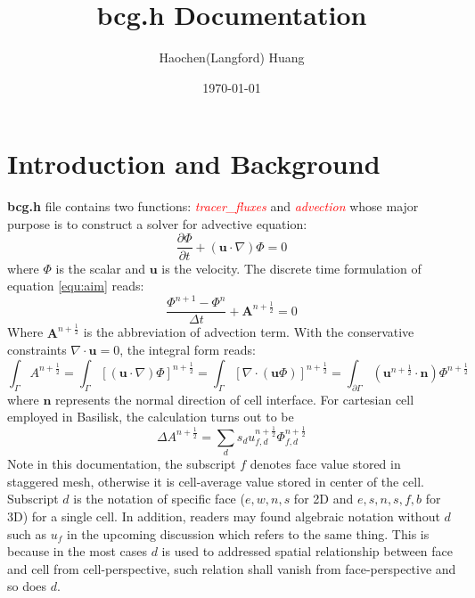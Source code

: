 \documentclass[a4paper]{article}
\title{bcg.h Documentation}
\author{Haochen(Langford) Huang}
\date{\today}
\begin{document}
\maketitle

\section{Introduction and Background}\label{sec:intro}
\textbf{bcg.h} file contains two functions: \textcolor{red}{\emph{tracer\_fluxes}} and \textcolor{red}{\emph{advection}} whose major purpose is to construct a solver for advective equation:
\begin{equation}
  \frac{\partial \Phi}{\partial t} + ( \mathbf{u} \cdot \nabla)\Phi = 0\label{equ:aim}
\end{equation}
where $\Phi$ is the scalar and $ \mathbf{u}$ is the velocity. The discrete time formulation of equation \ref{equ:aim} reads:
\begin{equation}
  \frac{\Phi^{n+1}-\Phi^{n}}{\Delta t} + \mathbf{A}^{n+\frac{1}{2}} = 0 \label{equ:general}
\end{equation}
Where $ \mathbf{A}^{n+ \frac{1}{2}}$ is the abbreviation of advection term. With the conservative constraints $\nabla \cdot \mathbf{u} = 0$, the integral form reads:
\begin{equation}
  \int_{\Gamma} A^{n+ \frac{1}{2}} = \int_{\Gamma} [( \mathbf{u}\cdot \nabla)\Phi]^{n+ \frac{1}{2}} = \int_{\Gamma} [\nabla\cdot( \mathbf{u} \Phi)]^{n+ \frac{1}{2}} = \int_{\partial \Gamma} ( \mathbf{u}^{n + \frac{1}{2}} \cdot \mathbf{n}) \Phi^{n+ \frac{1}{2}}
\end{equation}
where $ \mathbf{n}$ represents the normal direction of cell interface. For cartesian cell employed in Basilisk, the calculation turns out to be
\begin{equation}
  \Delta A^{n+ \frac{1}{2}} = \sum_{d} s_d u_{f,d}^{n+ \frac{1}{2}}\Phi_{f,d}^{n + \frac{1}{2}} 
\end{equation}
Note in this documentation, the subscript $f$ denotes face value stored in staggered mesh\cite{1965_Harlow}, otherwise it is cell-average value stored in center of the cell. Subscript $d$ is the notation of specific face ($e,w,n,s$ for 2D and $e,s,n,s,f,b$ for 3D) for a single cell. In addition, readers may found algebraic notation without $d$ such as $u_f$ in the upcoming discussion which refers to the same thing. This is because in the most cases $d$ is used to addressed spatial relationship between face and cell from cell-perspective, such relation shall vanish from face-perspective and so does $d$.
\end{document}
